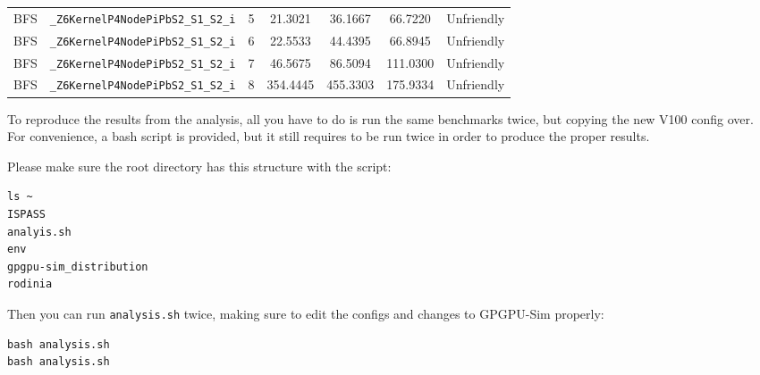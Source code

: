 \documentclass{article}
\begin{document}
\begin{table}[H]
\begin{tabular}{c c c c c c c}
BFS & \verb|_Z6KernelP4NodePiPbS2_S1_S2_i|           & 5  & 21.3021   & 36.1667  &  66.7220  & Unfriendly\\
BFS & \verb|_Z6KernelP4NodePiPbS2_S1_S2_i|           & 6  & 22.5533   & 44.4395  &  66.8945  & Unfriendly\\
BFS & \verb|_Z6KernelP4NodePiPbS2_S1_S2_i|           & 7  & 46.5675   & 86.5094  & 111.0300  & Unfriendly\\
BFS & \verb|_Z6KernelP4NodePiPbS2_S1_S2_i|           & 8  & 354.4445  & 455.3303 & 175.9334  & Unfriendly\\
[1ex] %
\hline %
\end{tabular}
\label{table:cache-unfriendly} %
\end{table}

To reproduce the results from the analysis, all you have to do is run the same benchmarks twice, but copying the new V100 config over. For convenience, a bash script is provided, but it still requires to be run twice in order to produce the proper results. 

Please make sure the root directory has this structure with the script:
\begin{verbatim}
ls ~
ISPASS  
analyis.sh  
env  
gpgpu-sim_distribution  
rodinia
\end{verbatim}

Then you can run \verb|analysis.sh| twice, making sure to edit the configs and changes to GPGPU-Sim properly:
\begin{verbatim}
bash analysis.sh
bash analysis.sh
\end{verbatim}
\end{document}
